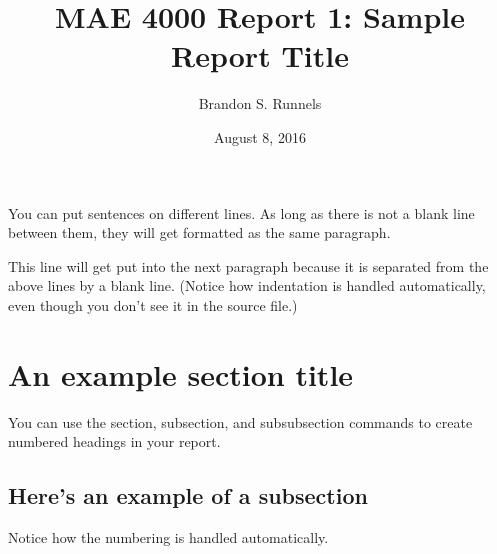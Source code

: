 \documentclass[11pt]{article}
\title{
  MAE 4000 Report 1:  %
  Sample Report Title %
}
\author{
  Brandon S. Runnels  %
}
\date{
  August 8, 2016      %
}
\begin{document}
\maketitle


You can put sentences on different lines.
As long as there is not a blank line between them, they will get formatted as the same paragraph.

This line will get put into the next paragraph because it is separated from the above lines by a blank line.
(Notice how indentation is handled automatically, even though you don't see it in the source file.)

\section{An example section title}

You can use the section, subsection, and subsubsection commands to create numbered headings in your report.

\subsection{Here's an example of a subsection}

Notice how the numbering is handled automatically.
\end{document}
